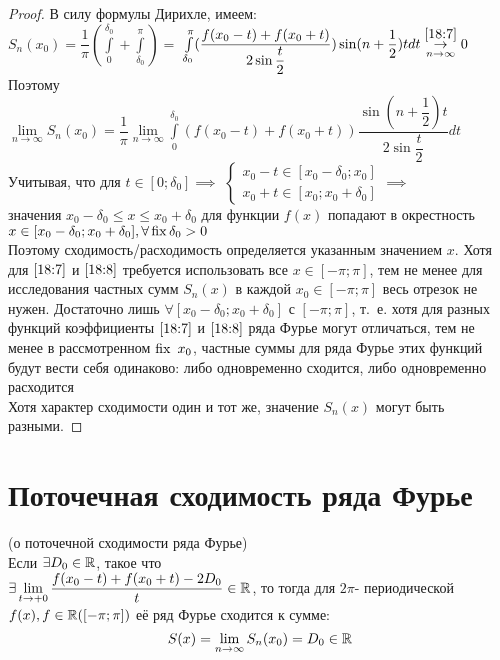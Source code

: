 \documentclass[../../main.tex]{subfiles}
\begin{document}
\begin{proof}
	В силу формулы Дирихле, имеем:\\
	$S_n(x_0) = \dfrac{1}{\pi}(\int\limits_{0}^{\delta_0} + 
	\int\limits_{\delta_0}^{\pi}) =$
	$\int\limits_{\delta_0}^{\pi}(\dfrac{f(x_0 - t) + f(x_0 + t)}
	{2\sin{\dfrac{t}{2}}})\sin(n+\dfrac{1}{2})tdt 
	 \overset{\eqref{18:7}}{\underset
		{n \rightarrow \infty}{\rightarrow}} 0$\\
	Поэтому \\
	$\lim\limits_{n \rightarrow \infty}{S_n(x_0)} = \dfrac{1}{\pi}
	\lim\limits_{n \rightarrow \infty}{\int\limits_{0}^{\delta_0}
	(f(x_0 - t) + f(x_0 + t)) \dfrac{\sin(n+\dfrac{1}{2})t}{
	2\sin\dfrac{t}{2}}}dt$\\
	Учитывая, что для $t \in [0; \delta_0 ] \implies$
	$\begin{cases}
		x_0 - t \in [x_0 - \delta_0; x_0] 
		\\
		x_0 + t \in [x_0; x_0 + \delta_0] 
	\end{cases}\implies$ \\
	значения $x_0 - \delta_0 \leq x \leq x_0 + \delta_0$ для функции $f(x)$
	попадают в окрестность\\
	 $x \in [x_0 - \delta_0; x_0 + \delta_0], \forall \operatorname{fix}
	  \delta_0 > 0$\\
	 Поэтому сходимость/расходимость определяется указанным значением $x$.
	 Хотя для $\eqref{18:7}$ и $\eqref{18:8}$ требуется использовать все
	 $x \in [-\pi; \pi]$, тем не менее для исследования частных сумм 
	 $S_n(x)$ в каждой $x_0 \in [-\pi; \pi]$ весь отрезок не нужен.
	 Достаточно лишь $\forall [x_0 - \delta_0; x_0 + \delta_0]$ с
	 $[-\pi; \pi]$, т.~е. хотя для разных функций коэффициенты 
	 $\eqref{18:7}$ и $\eqref{18:8}$ ряда Фурье могут отличаться, 
	 тем не менее в рассмотренном $\fix\ x_0$, частные суммы для
	 ряда Фурье
	 этих функций будут вести себя одинаково: либо одновременно сходится, 
	 либо одновременно расходится\\
	 Хотя характер сходимости один и тот же, значение $S_n(x)$ могут быть
	 разными.
\end{proof}

\section{Поточечная сходимость ряда Фурье}
\begin{thm}(о поточечной сходимости ряда Фурье)\\
	Если $\exists D_0 \in \mathbb{R}$, такое что
	\\$\exists \lim\limits_{t \rightarrow +0}{\dfrac
		{f(x_0 - t) + f(x_0 + t) - 2D_0}{t}} \in \mathbb{R}$, то тогда для
	$2\pi$- периодической $f(x), f \in \mathbb{R}([-\pi; \pi])$ её ряд Фурье
	сходится к сумме:
	\begin{equation}
		\label{18:11}
		S(x) = \lim\limits_{n \rightarrow \infty}S_n(x_0) = D_0 \in \mathbb{R}
	\end{equation}
\end{thm}
\end{document}
